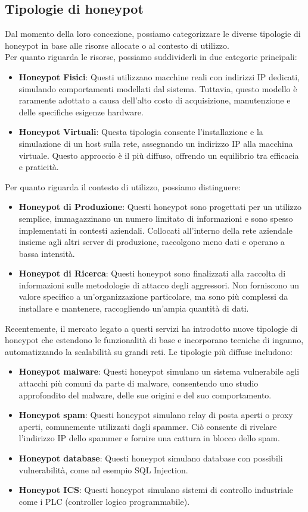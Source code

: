 \documentclass[12pt,a4paper,oneside,onecolumn,openright]{book}
\begin{document}
\subsection{Tipologie di honeypot}
Dal momento della loro concezione, possiamo categorizzare le diverse tipologie di 
honeypot in base alle risorse allocate o al contesto di utilizzo.\\
Per quanto riguarda le risorse, possiamo suddividerli in due categorie principali:
\begin{itemize}
	\item \textbf{Honeypot Fisici}: Questi utilizzano macchine reali con indirizzi IP 
	dedicati, simulando comportamenti modellati dal sistema. Tuttavia, questo modello 
	è raramente adottato a causa dell'alto costo di acquisizione, manutenzione e 
	delle specifiche esigenze hardware.
	\item \textbf{Honeypot Virtuali}: Questa tipologia consente l'installazione e la 
	simulazione di un host sulla rete, assegnando un indirizzo IP alla macchina virtuale. 
	Questo approccio è il più diffuso, offrendo un equilibrio tra efficacia e praticità.
\end{itemize}
Per quanto riguarda il contesto di utilizzo, possiamo distinguere:
\begin{itemize}
	\item \textbf{Honeypot di Produzione}: Questi honeypot sono progettati per un 
	utilizzo semplice, immagazzinano un numero limitato di informazioni e sono 
	spesso implementati in contesti aziendali. Collocati all'interno della rete 
	aziendale insieme agli altri server di produzione, raccolgono meno dati e 
	operano a bassa intensità.
	\item \textbf{Honeypot di Ricerca}: Questi honeypot sono finalizzati alla raccolta 
	di informazioni sulle metodologie di attacco degli aggressori. Non forniscono un 
	valore specifico a un'organizzazione particolare, ma sono più complessi da installare 
	e mantenere, raccogliendo un'ampia quantità di dati.
\end{itemize}
Recentemente, il mercato legato a questi servizi ha introdotto nuove tipologie 
di honeypot che estendono le funzionalità di base e incorporano tecniche di inganno, 
automatizzando la scalabilità su grandi reti. Le tipologie più diffuse includono:
\begin{itemize}
	\item \textbf{Honeypot malware}: Questi honeypot simulano un sistema vulnerabile 
	agli attacchi più comuni da parte di malware, consentendo uno studio approfondito 
	del malware, delle sue origini e del suo comportamento.
	\item \textbf{Honeypot spam}: Questi honeypot simulano relay di posta aperti o 
	proxy aperti, comunemente utilizzati dagli spammer. Ciò consente di rivelare 
	l'indirizzo IP dello spammer e fornire una cattura in blocco dello spam.
	\item \textbf{Honeypot database}: Questi honeypot simulano database con 
	possibili vulnerabilità, come ad esempio SQL Injection.
	\item \textbf{Honeypot ICS}: Questi honeypot simulano sistemi di controllo industriale 
	come i PLC (controller logico programmabile).
\end{itemize}
\newpage
\end{document}
